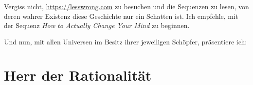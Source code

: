 \begin{chapterOpeningAuthorNote}
Vergiss nicht, \url{https://lesswrong.com} zu besuchen und die Sequenzen zu lesen, von deren wahrer Existenz diese Geschichte nur ein Schatten ist. Ich empfehle, mit der Sequenz \emph{How to Actually Change Your Mind} zu beginnen.

Und nun, mit allen Universen im Besitz ihrer jeweiligen Schöpfer, präsentiere ich:
\end{chapterOpeningAuthorNote}


\section{Herr der Rationalität}

